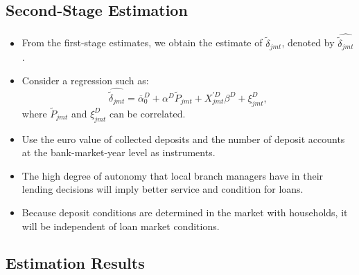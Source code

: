 \documentclass[]{book}
\providecommand{\tightlist}{%
  \setlength{\itemsep}{0pt}\setlength{\parskip}{0pt}}
\begin{document}
\subsection{Second-Stage Estimation}\label{second-stage-estimation}

\begin{itemize}
\tightlist
\item
  From the first-stage estimates, we obtain the estimate of
  \(\tilde{\delta}_{jmt}\), denoted by \(\hat{\tilde{\delta}_{jmt}}\).
\item
  Consider a regression such as: \[
  \hat{\tilde{\delta}_{jmt}} = \overline{\alpha}_0^D + \alpha^D \tilde{P}_{jmt} + X_{jmt}^{\prime D} \beta^D + \xi_{jmt}^D,
  \] where \(\tilde{P}_{jmt}\) and \(\xi_{jmt}^D\) can be correlated.
\item
  Use the euro value of collected deposits and the number of deposit
  accounts at the bank-market-year level as instruments.
\item
  The high degree of autonomy that local branch managers have in their
  lending decisions will imply better service and condition for loans.
\item
  Because deposit conditions are determined in the market with
  households, it will be independent of loan market conditions.
\end{itemize}

\subsection{Estimation Results}\label{estimation-results}
\end{document}
